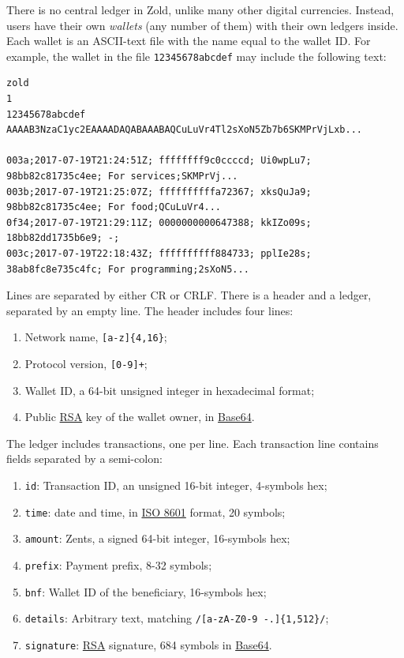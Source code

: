 \documentclass[11pt,oneside]{article}
\newcommand\dd[1]{\colorbox{gray!30}{\texttt{#1}}}
\begin{document}
There is no central ledger in Zold, unlike many other digital currencies.
Instead, users have their own \emph{wallets} (any number of them) with their own ledgers inside.
Each wallet is an ASCII-text file with the name equal to the wallet ID.
For example, the wallet in the file \dd{12345678abcdef} may include
the following text:

\begin{verbatim}
zold
1
12345678abcdef
AAAAB3NzaC1yc2EAAAADAQABAAABAQCuLuVr4Tl2sXoN5Zb7b6SKMPrVjLxb...

003a;2017-07-19T21:24:51Z; ffffffff9c0ccccd; Ui0wpLu7; 98bb82c81735c4ee; For services;SKMPrVj...
003b;2017-07-19T21:25:07Z; ffffffffffa72367; xksQuJa9; 98bb82c81735c4ee; For food;QCuLuVr4...
0f34;2017-07-19T21:29:11Z; 0000000000647388; kkIZo09s; 18bb82dd1735b6e9; -;
003c;2017-07-19T22:18:43Z; ffffffffff884733; pplIe28s; 38ab8fc8e735c4fc; For programming;2sXoN5...
\end{verbatim}

Lines are separated by either CR or CRLF.
There is a header and a ledger, separated by an empty line.
The header includes four lines:

\begin{enumerate}
  \item Network name, \dd{[a-z]\{4,16\}};
  \item Protocol version, \dd{[0-9]+};
  \item Wallet ID, a 64-bit unsigned integer in hexadecimal format;
  \item Public \href{https://en.wikipedia.org/wiki/RSA_(cryptosystem)}{RSA}
    key of the wallet owner, in \href{https://en.wikipedia.org/wiki/Base64}{Base64}.
\end{enumerate}

The ledger includes transactions, one per line. Each transaction line
contains fields separated by a semi-colon:

\begin{enumerate}
  \item \dd{id}: Transaction ID, an unsigned 16-bit integer, 4-symbols hex;
  \item \dd{time}: date and time, in \href{https://en.wikipedia.org/wiki/ISO_8601}{ISO 8601} format, 20 symbols;
  \item \dd{amount}: Zents, a signed 64-bit integer, 16-symbols hex;
  \item \dd{prefix}: Payment prefix, 8-32 symbols;
  \item \dd{bnf}: Wallet ID of the beneficiary, 16-symbols hex;
  \item \dd{details}: Arbitrary text, matching \dd{/[a-zA-Z0-9 -.]\{1,512\}/};
  \item \dd{signature}: \href{https://en.wikipedia.org/wiki/RSA_(cryptosystem)}{RSA} signature,
    684 symbols in \href{https://en.wikipedia.org/wiki/Base64}{Base64}.
\end{enumerate}
\end{document}
